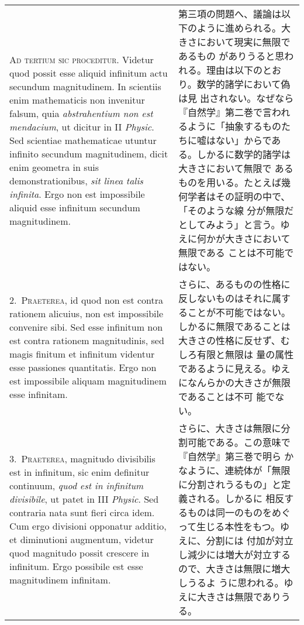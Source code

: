 \documentclass[10pt]{jsarticle} %
\begin{document}
\begin{longtable}{p{21em}p{21em}}
 

{\huge A}{\scshape d tertium sic proceditur}. Videtur quod possit esse
 aliquid infinitum actu secundum magnitudinem. In scientiis enim
 mathematicis non invenitur falsum, quia {\itshape abstrahentium non est
 mendacium}, ut dicitur in II {\itshape Physic}. Sed scientiae
 mathematicae utuntur infinito secundum magnitudinem, dicit enim
 geometra in suis demonstrationibus, {\itshape sit linea talis
 infinita}. Ergo non est impossibile aliquid esse infinitum secundum
 magnitudinem.

&

第三項の問題へ、議論は以下のように進められる。大きさにおいて現実に無限であるもの
 がありうると思われる。理由は以下のとおり。数学的諸学において偽は見
 出されない。なぜなら『自然学』第二巻で言われるように「抽象するものた
 ちに嘘はない」からである。しかるに数学的諸学は大きさにおいて無限で
 あるものを用いる。たとえば幾何学者はその証明の中で、「そのような線
 分が無限だとしてみよう」と言う。ゆえに何かが大きさにおいて無限である
 ことは不可能ではない。


\\


2.~{\scshape Praeterea}, id quod non est contra rationem alicuius, non est
 impossibile convenire sibi. Sed esse infinitum non est contra rationem
 magnitudinis, sed magis finitum et infinitum videntur esse passiones
 quantitatis. Ergo non est impossibile aliquam magnitudinem esse
 infinitam.

&

さらに、あるものの性格に反しないものはそれに属することが不可能ではない。
 しかるに無限であることは大きさの性格に反せず、むしろ有限と無限は
 量の属性であるように見える。ゆえになんらかの大きさが無限であることは不可
 能でない。

\\

3.~{\scshape Praeterea}, magnitudo divisibilis est in infinitum, sic enim definitur
 continuum, {\itshape quod est in infinitum divisibile}, ut patet in III
 {\itshape Physic}. Sed contraria nata sunt fieri circa idem. Cum ergo divisioni
 opponatur additio, et diminutioni augmentum, videtur quod magnitudo
 possit crescere in infinitum. Ergo possibile est esse magnitudinem
 infinitam.

&

さらに、大きさは無限に分割可能である。この意味で『自然学』第三巻で明ら
 かなように、連続体が「無限に分割されうるもの」と定義される。しかるに
 相反するものは同一のものをめぐって生じる本性をもつ。ゆえに、分割には
 付加が対立し減少には増大が対立するので、大きさは無限に増大しうるよ
 うに思われる。ゆえに大きさは無限でありうる。




\end{longtable}
\end{document}
